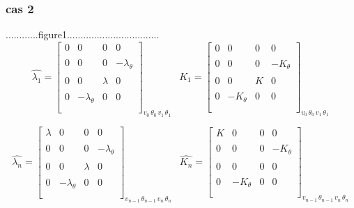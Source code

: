 \documentclass[a4paper,10pt]{report} %
\begin{document}
\subsubsection{cas 2 }
............figure1..................................
\[ \widehat{\lambda_1}=\left[ \begin{array}{cccc}
0 &0& 0&0     \\\\
0&0&0&-\lambda_{\theta} \\\\
0&0& \lambda&0    \\\\
0&-\lambda_{\theta}&0&0   \\\\
 \end{array} \right]_{v_0 \, \theta_0 \, v_1 \, \theta_1 \, }
 \,\,\,\,
 \widehat{K_1}=\left[ \begin{array}{cccc}
0 &0& 0&0     \\\\
0&0&0&-K_{\theta} \\\\
0&0& K&0    \\\\
0&-K_{\theta}&0&0   \\\\
 \end{array} \right]_{v_0 \, \theta_0 \, v_1 \, \theta_1 \, }\]
 
  \[ \widehat{\lambda_n}=\left[ \begin{array}{cccc}
\lambda &0& 0&0     \\\\
0&0&0&-\lambda_{\theta} \\\\
0&0& \lambda&0    \\\\
0&-\lambda_{\theta}&0&0   \\\\
 \end{array} \right]_{v_{n-1} \, \theta_{n-1} \, v_{n} \, \theta_{n} \, }
 \,\,\,\,
 \widehat{K_n}=\left[ \begin{array}{cccc}
K &0& 0&0     \\\\
0&0&0&-K_{\theta} \\\\
0&0& 0&0    \\\\
0&-K_{\theta}&0&0   \\\\
 \end{array} \right]_{v_{n-1} \, \theta_{n-1} \, v_{n} \, \theta_{n} \, }\]
\end{document}
